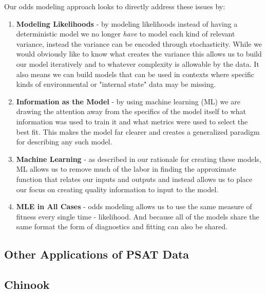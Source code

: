 \documentclass[11pt]{article}
\begin{document}
Our odds modeling approach looks to directly address these issues by:

\begin{enumerate}
\item \textbf{Modeling Likelihoods} - by modeling likelihoods instead of having a deterministic model we no longer \textit{have} to model each kind of relevant variance, instead the variance can be encoded through stochasticity. While we would obviously like to know what creates the variance this allows us to build our model iteratively and to whatever complexity is allowable by the data. It also means we can build models that can be used in contexts where specific kinds of environmental or "internal state" data may be missing.
\item \textbf{Information as the Model} - by using machine learning (ML) we are drawing the attention away from the specifics of the model itself to what information was used to train it and what metrics were used to select the best fit. This makes the model far clearer and creates a generalized paradigm for describing any such model.
\item \textbf{Machine Learning} - as described in our rationale for creating these models, ML allows us to remove much of the labor in finding the approximate function that relates our inputs and outputs and instead allows us to place our focus on creating quality information to input to the model.
\item \textbf{MLE in All Cases} - odds modeling allows us to use the same measure of fitness every single time - likelihood. And because all of the models share the same format the form of diagnostics and fitting can also be shared.
\end{enumerate}



\newpage









\subsection{Other Applications of PSAT Data}


\newpage








\subsection{Chinook}
\end{document}
